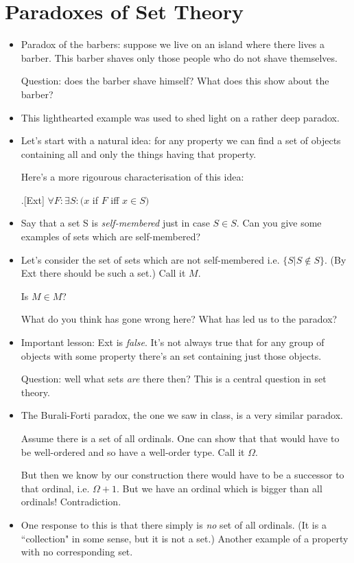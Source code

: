 \documentclass[justified]{tufte-handout}
\begin{document}
\section{Paradoxes of Set Theory}


\begin{itemize}


\item Paradox of the barbers: suppose we live on an island where there lives a barber. This barber shaves only those people who do not shave themselves. 

Question: does the barber shave himself? What does this show about the barber?


\item This lighthearted example was used to shed light on a rather deep paradox.






\item Let's start with a natural idea: for any property we can find a set of objects containing all and only the things having that property.


Here's a more rigourous characterisation of this idea: 

\ex.[Ext] $\forall F: \exists S: (x$ if $F$ iff  $x \in S)$


\item Say that a set S is \emph{self-membered} just in case $S\in S$. Can you give some examples of sets which are self-membered?


\item Let's consider the set of sets which are not self-membered i.e. $\{S| S \notin S\}$. (By Ext there should be such a set.) Call it $M$.

Is $M\in M$?

 What do you think has gone wrong here? What has led us to the paradox?


\item Important lesson: Ext is \emph{false}. It's not always true that for any group of objects with some property there's an set containing just those objects. 

Question: well what sets \emph{are} there then? This is a central question in set theory.

\item The Burali-Forti paradox, the one we saw in class, is a very similar paradox.

Assume there is a set of all ordinals. One can show that that would have to be well-ordered and so have a well-order type. Call it $\Omega$.

But then we know by our construction there would have to be a successor to that ordinal, i.e. $\Omega +1$. But we have an ordinal which is bigger than all ordinals! Contradiction.



\item One response to this is that there simply is \emph{no} set of all ordinals. (It is a ``collection" in some sense, but it is not a set.) Another example of a property with no corresponding set.

\end{itemize}
\end{document}
